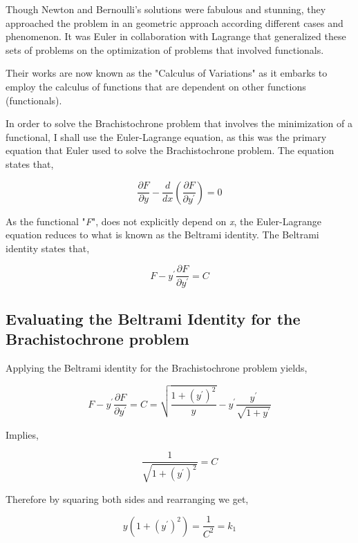 

{Though Newton and Bernoulli's solutions were fabulous and stunning, they approached the problem in an geometric approach according different cases and phenomenon. It was Euler in collaboration with Lagrange that generalized these sets of problems on the optimization of problems that involved functionals.}

{Their works are now known as the "Calculus of Variations" as it embarks to employ the calculus of functions that are dependent on other functions (functionals).}

{In order to solve the Brachistochrone problem that involves the minimization of a functional, I shall use the Euler-Lagrange equation, as this was the primary equation that Euler used to solve the Brachistochrone problem. The equation states that,}

	$$\frac{\partial F}{\partial y} - \frac{d}{dx}\left(\frac{\partial F}{\partial y^{\prime}}\right) = 0$$

{As the functional "\textit{F}", does not explicitly depend on \textit{x}, the Euler-Lagrange equation reduces to what is known as the Beltrami identity. The Beltrami identity states that,}

	$$F - y^{\prime}\frac{\partial F}{\partial y^{\prime}} = C$$



\subsection{Evaluating the Beltrami Identity for the Brachistochrone problem}

	{Applying the Beltrami identity for the Brachistochrone problem yields,}

		$$F - y^{\prime}\frac{\partial F}{\partial y^{\prime}} = C = \sqrt{\frac{1 + \left(y^{\prime}\right)^2}{y}} - y^{\prime}\frac{y^{\prime}}{\sqrt{1 + y^{\prime}}}$$

	{Implies,}

		$$\frac{1}{\sqrt{1 + \left(y^{\prime}\right)^2}} = C$$

	{Therefore by squaring both sides and rearranging we get,}

		$$y\left(1 + \left(y^{\prime}\right)^2\right) = \frac{1}{C^2} = k_{1}$$

